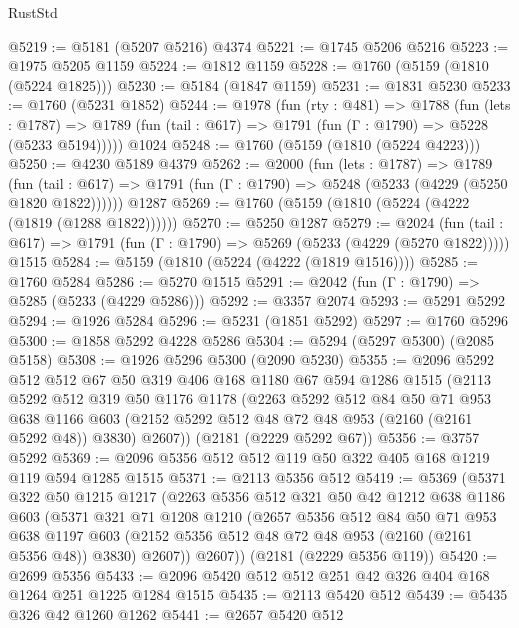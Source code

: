 \begin{lexlean}{RustStd}
\begin{coremodule}
@5219 := @5181 (@5207 @5216) @4374
@5221 := @1745 @5206 @5216
@5223 := @1975 @5205 @1159
@5224 := @1812 @1159
@5228 := @1760 (@5159 (@1810 (@5224 @1825)))
@5230 := @5184 (@1847 @1159)
@5231 := @1831 @5230
@5233 := @1760 (@5231 @1852)
@5244 := @1978
    (fun (rty : @481) =>
    @1788
      (fun (lets : @1787) =>
      @1789 (fun (tail : @617) => @1791 (fun (Γ : @1790) => @5228 (@5233 @5194)))))
    @1024
@5248 := @1760 (@5159 (@1810 (@5224 @4223)))
@5250 := @4230 @5189 @4379
@5262 := @2000
    (fun (lets : @1787) =>
    @1789
      (fun (tail : @617) => @1791 (fun (Γ : @1790) => @5248 (@5233 (@4229 (@5250 @1820 @1822))))))
    @1287
@5269 := @1760 (@5159 (@1810 (@5224 (@4222 (@1819 (@1288 @1822))))))
@5270 := @5250 @1287
@5279 := @2024
    (fun (tail : @617) => @1791 (fun (Γ : @1790) => @5269 (@5233 (@4229 (@5270 @1822)))))
    @1515
@5284 := @5159 (@1810 (@5224 (@4222 (@1819 @1516))))
@5285 := @1760 @5284
@5286 := @5270 @1515
@5291 := @2042 (fun (Γ : @1790) => @5285 (@5233 (@4229 @5286)))
@5292 := @3357 @2074
@5293 := @5291 @5292
@5294 := @1926 @5284
@5296 := @5231 (@1851 @5292)
@5297 := @1760 @5296
@5300 := @1858 @5292 @4228 @5286
@5304 := @5294 (@5297 @5300) (@2085 @5158)
@5308 := @1926 @5296 @5300 (@2090 @5230)
@5355 := @2096
    @5292
    @512
    @512
    @67
    @50
    @319
    @406
    @168
    @1180
    @67
    @594
    @1286
    @1515
    (@2113
      @5292
      @512
      @319
      @50
      @1176
      @1178
      (@2263
        @5292
        @512
        @84
        @50
        @71
        @953
        @638
        @1166
        @603
        (@2152 @5292 @512 @48 @72 @48 @953 (@2160 (@2161 @5292 @48)) @3830)
        @2607))
    (@2181 (@2229 @5292 @67))
@5356 := @3757 @5292
@5369 := @2096 @5356 @512 @512 @119 @50 @322 @405 @168 @1219 @119 @594 @1285 @1515
@5371 := @2113 @5356 @512
@5419 := @5369
    (@5371
      @322
      @50
      @1215
      @1217
      (@2263
        @5356
        @512
        @321
        @50
        @42
        @1212
        @638
        @1186
        @603
        (@5371
          @321
          @71
          @1208
          @1210
          (@2657
            @5356
            @512
            @84
            @50
            @71
            @953
            @638
            @1197
            @603
            (@2152 @5356 @512 @48 @72 @48 @953 (@2160 (@2161 @5356 @48)) @3830)
            @2607))
        @2607))
    (@2181 (@2229 @5356 @119))
@5420 := @2699 @5356
@5433 := @2096 @5420 @512 @512 @251 @42 @326 @404 @168 @1264 @251 @1225 @1284 @1515
@5435 := @2113 @5420 @512
@5439 := @5435 @326 @42 @1260 @1262
@5441 := @2657 @5420 @512

\end{coremodule}
\end{lexlean}
